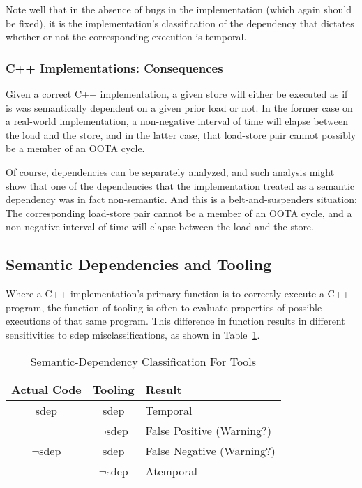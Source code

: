 \documentclass[10]{article}
\begin{document}
Note well that in the absence of bugs in the implementation (which
again should be fixed), it is the implementation's classification of
the dependency that dictates whether or not the corresponding execution
is temporal.

\subsubsection{C++ Implementations: Consequences}
\label{sec:C++ Implementations: Consequences}

Given a correct C++ implementation, a given store will either be
executed as if is was semantically dependent on a given prior load or
not.
In the former case on a real-world implementation, a non-negative interval
of time will elapse between the load and the store, and in the latter
case, that load-store pair cannot possibly be a member of an OOTA cycle.

Of course, dependencies can be separately analyzed, and such analysis
might show that one of the dependencies that the implementation treated
as a semantic dependency was in fact non-semantic.
And this is a belt-and-suspenders situation:
The corresponding load-store pair cannot be a member of an OOTA cycle,
and a non-negative interval of time will elapse between the load and
the store.

\subsection{Semantic Dependencies and Tooling}
\label{sec:Semantic Dependencies and Tooling}

Where a C++ implementation's primary function is to correctly execute
a C++ program, the function of tooling is often to evaluate properties
of possible executions of that same program.
This difference in function results in different sensitivities to
sdep misclassifications, as shown in
Table~\ref{tab:Semantic-Dependency Classification For Tools}.

\begin{table}
\centering
\begin{tabular}{c|c|l}
Actual Code	& Tooling		& Result \\
\hline
sdep		& sdep			& Temporal \\
\cline{2-3}
		& $\neg$sdep		& False Positive (Warning?) \\
\hline
$\neg$sdep	& sdep			& False Negative (Warning?) \\
\cline{2-3}
		& $\neg$sdep		& Atemporal \\
\end{tabular}
\caption{Semantic-Dependency Classification For Tools}
\label{tab:Semantic-Dependency Classification For Tools}
\end{table}
\end{document}
